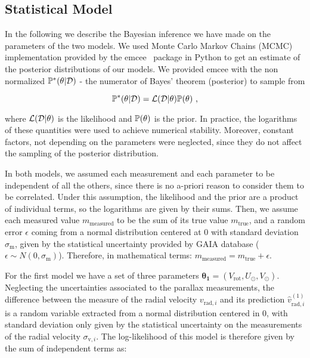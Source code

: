\subsection{Statistical Model}\label{subsec:StatisticalModel}
In the following we describe the Bayesian inference we have made on the parameters of the two models. 
We used Monte Carlo Markov Chains (MCMC) implementation provided by the emcee~\cite{EMCEE} package in Python to get an estimate of the posterior distributions of our models.
We provided emcee with the non normalized $\mathbb{P}^{*}(\theta \vert \mathcal{D})$ - the numerator of Bayes' theorem (posterior) to sample from

\begin{equation}\label{Eq:NonNormPosterior}
    \mathbb{P}^{*}(\theta \vert \mathcal{D}) = \mathcal{L}(\mathcal{D} \vert \theta) \mathbb{P}(\theta) \text{ ,}
\end{equation}

\noindent where $\mathcal{L}(\mathcal{D} \vert \theta)$ is the likelihood and $\mathbb{P}(\theta)$ is the prior. In practice, the logarithms of these quantities were used to achieve numerical stability. Moreover, constant factors, not depending on the parameters were neglected, since they do not affect the sampling of the posterior distribution.

In both models, we assumed each measurement and each parameter to be independent of all the others, since there is no a-priori reason to consider them to be correlated. 
Under this assumption, the likelihood and the prior are a product of individual terms, so the logarithms are given by their sums. 
Then, we assume each measured value $m_{\text{measured}}$ to be the sum of its true value $m_{\text{true}}$, and a random error $\epsilon$ coming from a normal distribution centered at 0 with standard deviation $\sigma_{\text{m}}$, given by the statistical uncertainty provided by GAIA database ($\epsilon \sim N(0, \sigma_\text{m})$). 
Therefore, in mathematical terms: $m_{\text{measured}} = m_{\text{true}} + \epsilon$.

For the first model we have a set of three parameters $\mathbf{\theta_1} = (V_{\text{rot}}, U_{\odot}, V_{\odot})$. 
Neglecting the uncertainties associated to the parallax measurements, the difference between the measure of the radial velocity $v_{\text{rad}, i}$ and its prediction $\hat{v}^{(1)}_{\text{rad}, i}$ is a random variable extracted from a normal distribution centered in 0, with standard deviation only given by the statistical uncertainty on the measurements of the radial velocity $\sigma_{\text{v},i}$. 
The log-likelihood of this model is therefore given by the sum of independent terms as:

